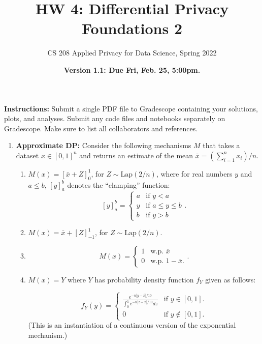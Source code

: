 \documentclass[11pt]{article}
\title{\vspace{-1.5cm} HW 4: Differential Privacy Foundations 2}
\author{CS 208 Applied Privacy for Data Science, Spring 2022}
\date{\textbf{Version 1.1: Due Fri, Feb. 25, 5:00pm.}}
\newcommand{\instructions}{\noindent \textbf{Instructions:} Submit a single PDF file to Gradescope containing your solutions, plots, and analyses. Submit any code files and notebooks separately on Gradescope. Make sure to list all collaborators and references.}
\begin{document}
\maketitle

\instructions

\begin{enumerate}[leftmargin=*]

\item \textbf{Approximate DP:} Consider the following mechanisms $M$ that takes a dataset $x\in [0,1]^n$ and returns
an estimate of the mean $\bar{x} = (\sum_{i=1}^n x_i)/n$.

\begin{enumerate}[label=\roman*.]
    \item $M(x) = [\bar{x}+Z]^1_0$, for $Z\sim \mathrm{Lap}(2/n)$,
    where for real numbers $y$ and $a\leq b$, $[y]^b_a$ denotes the ``clamping'' function:
$$[y]^b_a = 
\begin{cases}
a & \text{if } y < a\\
y & \text{if } a\leq y\leq b\\
b & \text{if } y >b
\end{cases}.$$
    \item $M(x) = \bar{x}+[Z]^1_{-1}$, for $Z\sim \mathrm{Lap}(2/n)$.
    \item 
    $$M(x) = \begin{cases} 1 & \text{w.p. } \overline{x}\\
    0 & \text{w.p. } 1-\overline{x}.
    \end{cases}.$$
    \item $M(x) = Y$ where $Y$ has probability density function $f_Y$ given as follows:
    
    $$f_Y(y) = \begin{cases}
    \frac{e^{-n|y-\bar{x}|/10}}{\int_0^1 e^{-n|z-\bar{x}|/10} dz} & \text{if } y\in [0,1].\\
    0 & \text{if } y\notin [0,1].
    \end{cases}$$
    (This is an instantiation of a continuous version
    of the exponential mechanism.)
    

\end{enumerate}
\end{enumerate}
\end{document}
